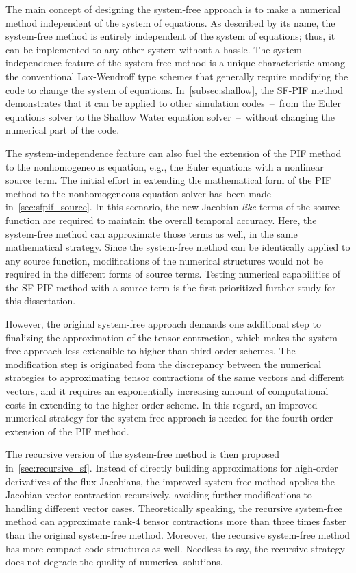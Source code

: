 The main concept of designing the system-free approach is to make a numerical method
independent of the system of equations. As described by its name, the system-free method
is entirely independent of the system of equations;
thus, it can be implemented to any other system without a hassle.
The system independence feature of the system-free method is a unique characteristic
among the conventional Lax-Wendroff type schemes that generally require
modifying the code to change the system of equations.
In~\cref{subsec:shallow}, the SF-PIF method demonstrates that
it can be applied to other simulation codes~--~from the Euler equations solver
to the Shallow Water equation solver~--~without changing the numerical part of the code.

The system-independence feature can also fuel the extension of the PIF method
to the nonhomogeneous equation, e.g., the Euler equations with a nonlinear source term.
The initial effort in extending the mathematical form of the PIF method to the nonhomogeneous equation solver
has been made in~\cref{sec:sfpif_source}. In this scenario, the new Jacobian-\textit{like} terms
of the source function are required to maintain the overall temporal accuracy.
Here, the system-free method can approximate those terms as well,
in the same mathematical strategy.
Since the system-free method can be identically applied to any source function,
modifications of the numerical structures would not be required in the different forms of source terms.
Testing numerical capabilities of the SF-PIF method with a source term
is the first prioritized further study for this dissertation.

However, the original system-free approach demands one additional step
to finalizing the approximation of the tensor contraction,
which makes the system-free approach less extensible to higher than third-order schemes.
The modification step is originated from the discrepancy between
the numerical strategies to approximating tensor contractions of the same vectors and different vectors,
and it requires an exponentially increasing amount of computational costs
in extending to the higher-order scheme.
In this regard, an improved numerical strategy
for the system-free approach is needed for the fourth-order extension of the PIF method.

The recursive version of the system-free method is then proposed in~\cref{sec:recursive_sf}.
Instead of directly building approximations for high-order derivatives of the flux Jacobians,
the improved system-free method applies the Jacobian-vector contraction recursively,
avoiding further modifications to handling different vector cases.
Theoretically speaking, the recursive system-free method can approximate rank-4 tensor contractions
more than three times faster than the original system-free method.
Moreover, the recursive system-free method has more compact code structures as well.
Needless to say, the recursive strategy does not degrade the quality of numerical solutions.

